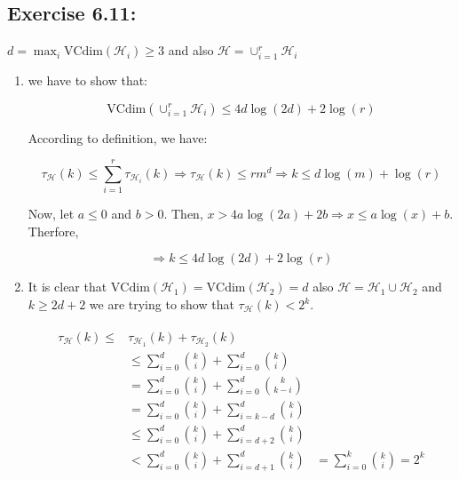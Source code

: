\documentclass[]{book}
\begin{document}
\subsection*{Exercise 6.11:}

$d=\max_i \text{VCdim}(\mathcal{H}_i)\geq 3$ and also $\mathcal{H}=\cup _{i=1}^r\mathcal{H}_i$ 

\begin{enumerate}
    \item we have to show that:

\begin{equation*}
    \text{VCdim}\left ( \cup _{i=1}^r\mathcal{H}_i \right )\leq 4d\log (2d)+2\log (r)
\end{equation*}

 According to definition, we have:
 
 \begin{equation*}
     \tau_\mathcal H(k)\leq \sum_{i=1}^r \tau_{\mathcal{H}_i} (k)\Rightarrow \tau_\mathcal H(k)\leq rm^d\Rightarrow 
k\leq d\log (m) +\log (r)
 \end{equation*}
 
 Now, let $a\leq 0$ and $b>0$. Then, $x>4a\log(2a)+2b\Rightarrow x \leq a\log(x)+b$. Therfore,
 
 \begin{equation*}
     \Rightarrow k\leq 4d \log(2d)+2\log(r)
 \end{equation*}
 
 \item It is clear that $\text{VCdim}(\mathcal{H}_1)=\text{VCdim}(\mathcal{H}_2)=d$ also $\mathcal{H}=\mathcal{H}_1 \cup \mathcal{H_2}$ and $k\geq 2d+2$ we are trying to show that $\tau _\mathcal{H}(k)<2^k$.
 
\begin{align*}
\begin{matrix}
\tau_\mathcal{H}(k)\leq &\tau_{\mathcal{H}_1}(k)+\tau_{\mathcal{H}_2}(k) \\ 
 &\leq \sum_{i=0}^d\binom{k}{i}+\sum_{i=0}^d\binom{k}{i} \\ 
 &=\sum_{i=0}^d\binom{k}{i}+\sum_{i=0}^d\binom{k}{k-i}  \\ 
 &= \sum_{i=0}^d\binom{k}{i}+\sum_{i=k-d}^d\binom{k}{i} \\
& \leq \sum_{i=0}^d\binom{k}{i}+\sum_{i=d+2}^d\binom{k}{i} \\
& < \sum_{i=0}^d\binom{k}{i}+\sum_{i=d+1}^d\binom{k}{i}  & =\sum_{i=0}^k\binom{k}{i}=2^k
\end{matrix}
\end{align*}
\end{enumerate}
\end{document}
